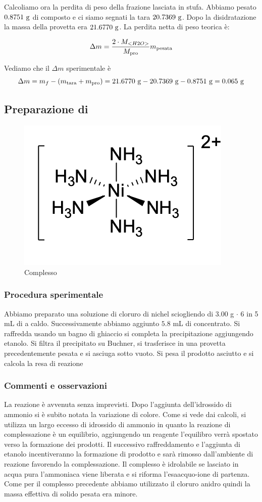 Calcoliamo ora la perdita di peso della frazione lasciata in stufa. Abbiamo pesato $ 0.8751  \mathrm{\ g} $ di composto e ci siamo segnati la tara   $ 20.7369\mathrm{\ g}$. Dopo la disidratazione la massa della provetta era $ 21.6770 \mathrm{\ g}$. La perdita netta di peso teorica è: 

\[ \Delta m =\frac{ 2\cdot M_{<H2O>}}{M_{\text{pro}} } m_{\text{pesata}} \]

Vediamo che il $\Delta m$ sperimentale è 
\[ \Delta m = m_f -(m_{\text{tara}} +m_{\text{pro}}) = 21.6770 \mathrm{\ g} - 20.7369 \mathrm{\ g} - 0.8751   \mathrm{\ g} = 0.065\mathrm{\ g}\]
\subsection{Preparazione di {\ce{[Ni(NH3)6] }}}

\begin{figure}[ht!]
    \centering
    \includegraphics[width=0.3\linewidth]{foto/ninh3.png}
    \caption{Complesso \ce{[Ni(NH3)6] }}
    \label{fig:ninh3}
\end{figure}
\subsubsection{Procedura sperimentale}
Abbiamo preparato una soluzione di cloruro di nichel sciogliendo di $3.00$ g  $\cdot$ 6 
in 5 mL di  a caldo. Successivamente abbiamo aggiunto $5.8$ mL di  concentrato. Si raffredda usando un bagno di ghiaccio si completa la precipitazione aggiungendo etanolo. Si filtra il precipitato su Buchner, si trasferisce in una provetta precedentemente pesata e si asciuga sotto vuoto. Si pesa il prodotto asciutto e si calcola la resa di reazione
\subsubsection{Commenti e osservazioni}
La reazione è avvenuta senza imprevisti. Dopo l'aggiunta dell'idrossido di ammonio si è subito notata la variazione di colore. Come si vede dai calcoli, si utilizza un largo eccesso di idrossido di ammonio in quanto la reazione di complessazione è un equilibrio, aggiungendo un reagente l'equilibro verrà spostato verso la formazione dei prodotti. Il successivo raffreddamento e l'aggiunta di etanolo incentiveranno la formazione di prodotto e sarà rimosso dall'ambiente di reazione favorendo la complessazione. Il complesso è idrolabile se lasciato in acqua pura l'ammoniaca viene liberata e si riforma l'esaacquo-ione di partenza. Come per il complesso precedente abbiamo utilizzato il cloruro anidro quindi la massa effettiva di solido pesata era minore.




